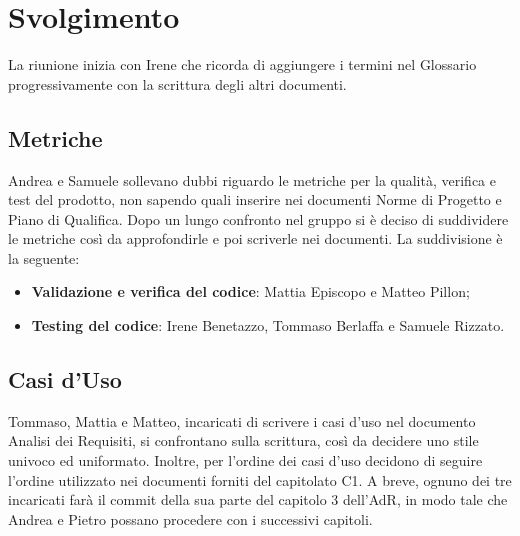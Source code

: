 \section{Svolgimento}
La riunione inizia con Irene che ricorda di aggiungere i termini nel Glossario progressivamente con la 
scrittura degli altri documenti.
\subsection{Metriche}
Andrea e Samuele sollevano dubbi riguardo le metriche per la qualità, verifica e test del prodotto,
non sapendo quali inserire nei documenti Norme di Progetto e Piano di Qualifica. \newline
Dopo un lungo confronto nel gruppo si è deciso di suddividere le metriche così da approfondirle e 
poi scriverle nei documenti. La suddivisione è la seguente:
\begin{itemize}
    \item \textbf{Validazione e verifica del codice}: Mattia Episcopo e Matteo Pillon;
    \item \textbf{Testing del codice}: Irene Benetazzo, Tommaso Berlaffa e Samuele Rizzato. 
\end{itemize}

\subsection{Casi d'Uso}
Tommaso, Mattia e Matteo, incaricati di scrivere i casi d'uso nel documento Analisi dei 
Requisiti, si confrontano sulla scrittura, così da decidere uno stile univoco ed uniformato. Inoltre, per l'ordine dei casi d'uso decidono 
di seguire l'ordine utilizzato nei documenti forniti del capitolato C1. A breve, ognuno dei tre incaricati farà il commit della sua parte del 
capitolo 3 dell'AdR, in modo tale che Andrea e Pietro possano procedere con i successivi capitoli.


